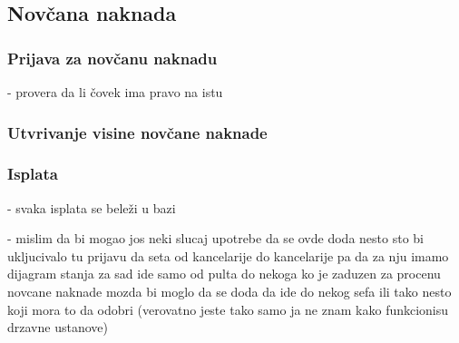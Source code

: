 \subsection{Nov\v cana naknada}

\subsubsection{Prijava za nov\v canu naknadu}
- provera da li \v covek ima pravo  na istu

\subsubsection{Utvr\dj ivanje visine nov\v cane naknade}

\subsubsection{Isplata}
- svaka isplata se bele\v zi u bazi

- mislim da bi mogao jos neki slucaj upotrebe da se ovde doda
  nesto sto bi ukljucivalo tu prijavu da seta od kancelarije do kancelarije
  pa da za nju imamo dijagram stanja
  za sad ide samo od pulta do nekoga ko je zaduzen za procenu novcane naknade
  mozda bi moglo da se doda da ide do nekog sefa ili tako nesto koji mora to da odobri
  (verovatno jeste tako samo ja ne znam kako funkcionisu drzavne ustanove)